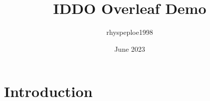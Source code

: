 \documentclass{article}
\title{IDDO Overleaf Demo}
\author{rhyspeploe1998 }
\date{June 2023}
\begin{document}
\maketitle

\section{Introduction}
\end{document}

